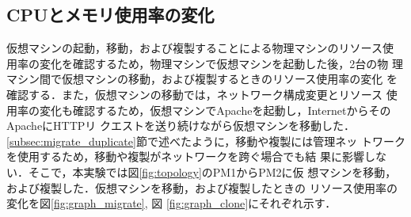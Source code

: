 \documentclass[submit,techrep]{ipsj}
\begin{document}





\subsection{CPUとメモリ使用率の変化}
仮想マシンの起動，移動，および複製することによる物理マシンのリソース使
用率の変化を確認するため，物理マシンで仮想マシンを起動した後，2台の物
理マシン間で仮想マシンの移動，および複製するときのリソース使用率の変化
を確認する．また，仮想マシンの移動では，ネットワーク構成変更とリソース
使用率の変化も確認するため，仮想マシンでApacheを起動し，InternetからそのApacheにHTTPリ
クエストを送り続けながら仮想マシンを移動した．
\ref{subsec:migrate_duplicate}節で述べたように，移動や複製には管理ネッ
トワークを使用するため，移動や複製がネットワークを跨ぐ場合でも結
果に影響しない．そこで，本実験では図\ref{fig:topology}のPM1からPM2に仮
想マシンを移動，および複製した．仮想マシンを移動，および複製したときの
リソース使用率の変化を図\ref{fig:graph_migrate}, 図
\ref{fig:graph_clone}にそれぞれ示す．
\end{document}
